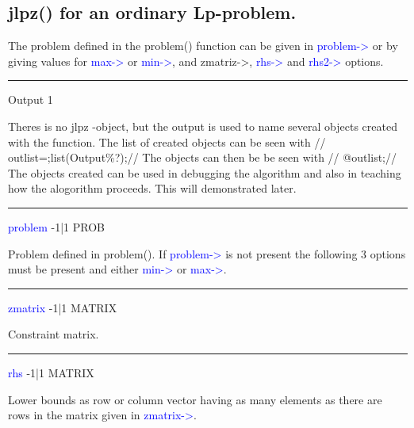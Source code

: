 \subsection{\textcolor{VioletRed}{jlpz}() for an ordinary Lp-problem.}
\label{jlpz}
The problem defined in the \textcolor{VioletRed}{problem}() function can be given in \textcolor{blue}{problem->} or by giving values
for \textcolor{blue}{max->} or \textcolor{blue}{min->}, and zmatriz->, \textcolor{blue}{rhs->} and \textcolor{blue}{rhs2->} options.
\vspace{0.3cm}
\hrule
\vspace{0.3cm}
\noindent Output  \tabto{3cm} 1  \tabto{5cm}     \tabto{7cm}
\begin{changemargin}{3cm}{0cm}
\noindent  Theres is no jlpz -object, but the output is used to name
several objects created with the function. The list of created objects can be seen
with //
outlist=;list(Output\%?);//
The objects can then be be seen with //
@outlist;//
The objects created can be used in debugging the algorithm and also in teaching how the alogorithm
proceeds. This will demonstrated later.
\end{changemargin}
\vspace{0.3cm}
\hrule
\vspace{0.3cm}
\noindent \textcolor{blue}{problem} \tabto{3cm}  -1|1 \tabto{5cm}  PROB \tabto{7cm}
\begin{changemargin}{3cm}{0cm}
\noindent Problem defined in \textcolor{VioletRed}{problem}(). If \textcolor{blue}{problem->} is not present
the following 3 options must be present and either \textcolor{blue}{min->} or \textcolor{blue}{max->}.
\end{changemargin}
\vspace{0.3cm}
\hrule
\vspace{0.3cm}
\noindent \textcolor{blue}{zmatrix}  \tabto{3cm} -1|1 \tabto{5cm}  MATRIX \tabto{7cm}
\begin{changemargin}{3cm}{0cm}
\noindent  Constraint matrix.
\end{changemargin}
\vspace{0.3cm}
\hrule
\vspace{0.3cm}
\noindent \textcolor{blue}{rhs}  \tabto{3cm} -1|1 \tabto{5cm}  MATRIX \tabto{7cm}
\begin{changemargin}{3cm}{0cm}
\noindent  Lower bounds as row or column vector having as many elements as there are
rows in the matrix given in \textcolor{blue}{zmatrix->}.
\end{changemargin}
\vspace{0.3cm}
